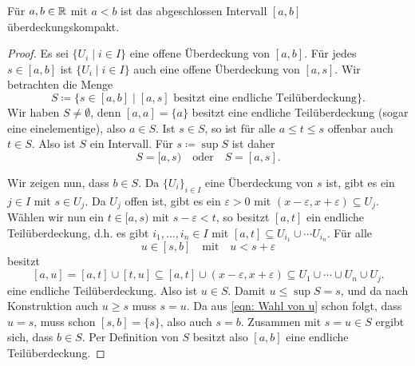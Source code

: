 \documentclass[a4paper,10pt]{article}
\begin{document}
\begin{lem}
 Für $a,b \in \mathbb{R}$ mit $a < b$ ist das abgeschlossen Intervall $[a,b]$ überdeckungskompakt.
\end{lem}
\begin{proof}
 Es sei $\{U_i \mid i \in I\}$ eine offene Überdeckung von $[a,b]$. Für jedes $s \in [a,b]$ ist $\{U_i \mid i \in I\}$ auch eine offene Überdeckung von $[a,s]$. Wir betrachten die Menge
 \[
  S \coloneqq \{s \in [a,b] \mid \text{$[a,s]$ besitzt eine endliche Teilüberdeckung}\}.
 \]
 Wir haben $S \neq \emptyset$, denn $[a,a] = \{a\}$ besitzt eine endliche Teilüberdeckung (sogar eine einelementige), also $a \in S$. Ist $s \in S$, so ist für alle $a \leq t \leq s$ offenbar auch $t \in S$. Also ist $S$ ein Intervall. Für $s \coloneqq \sup S$ ist daher
 \[
  S = [a,s) \quad \text{oder} \quad S = [a,s].
 \]
 
 Wir zeigen nun, dass $b \in S$. Da $\{U_i\}_{i \in I}$ eine Überdeckung von $s$ ist, gibt es ein $j \in I$ mit $s \in U_j$. Da $U_j$ offen ist, gibt es ein $\varepsilon > 0$ mit $(x-\varepsilon,x+\varepsilon) \subseteq U_j$. Wählen wir nun ein $t \in [a,s)$ mit $s-\varepsilon < t$, so besitzt $[a,t]$ ein endliche Teilüberdeckung, d.h. es gibt $i_1, \dotsc, i_n \in I$ mit $[a,t] \subseteq U_{i_1} \cup \dotsb U_{i_n}$. Für alle
 \begin{equation}\label{eqn: Wahl von u}
  u \in [s,b] \quad \text{mit} \quad u < s + \varepsilon
 \end{equation}
 besitzt
 \[
  [a,u]
  = [a,t] \cup [t,u]
  \subseteq [a,t] \cup (x-\varepsilon, x+\varepsilon)
  \subseteq U_1 \cup \dotsb \cup U_n \cup U_j.
 \]
 eine endliche Teilüberdeckung. Also ist $u \in S$. Damit $u \leq \sup S = s$, und da nach Konstruktion auch $u \geq s$ muss $s = u$. Da aus \eqref{eqn: Wahl von u} schon folgt, dass $u = s$, muss schon $[s,b] = \{s\}$, also auch $s = b$. Zusammen mit $s = u \in S$ ergibt sich, dass $b \in S$. Per Definition von $S$ besitzt also $[a,b]$ eine endliche Teilüberdeckung.
\end{proof}
\end{document}
